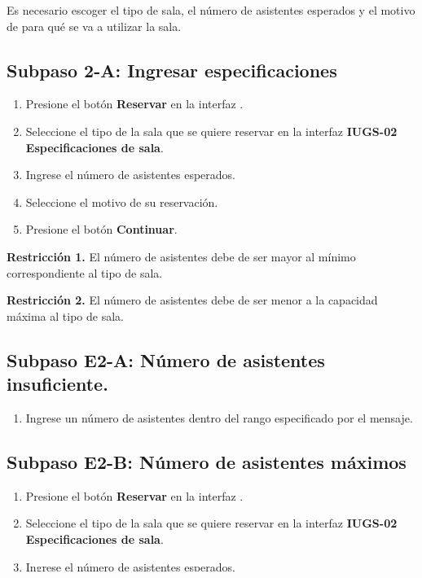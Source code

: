 Es necesario escoger el tipo de sala, el número de asistentes esperados y 
el motivo de para qué se va a utilizar la sala.

\subsection{Subpaso 2-A: Ingresar especificaciones}
\begin{enumerate}
	\item Presione el botón \textbf{Reservar} en la interfaz
		.
	\item Seleccione el tipo de la sala que se quiere reservar
		en la interfaz \textbf{IUGS-02 Especificaciones de sala}.
	\item Ingrese el número de asistentes esperados.
	\item Seleccione el motivo de su reservación.
	\item Presione el botón \textbf{Continuar}.
\end{enumerate}

\textbf{Restricción 1.} El número de asistentes debe de ser mayor al 
	mínimo correspondiente al tipo de sala. 

\textbf{Restricción 2.} El número de asistentes debe de ser menor a la
	capacidad máxima al tipo de sala.

\subsection{Subpaso E2-A: Número de asistentes insuficiente.}
\begin{enumerate}
	\item Ingrese un número de asistentes dentro del rango
		especificado por el mensaje.
\end{enumerate}

\subsection{Subpaso E2-B: Número de asistentes máximos}
\begin{enumerate}
	\item Presione el botón \textbf{Reservar} en la interfaz
		.
	\item Seleccione el tipo de la sala que se quiere reservar
		en la interfaz \textbf{IUGS-02 Especificaciones de sala}.
	\item Ingrese el número de asistentes esperados.
	\item Seleccione el motivo de su reservación.
	\item Presione el botón \textbf{Continuar}.
\end{enumerate}

